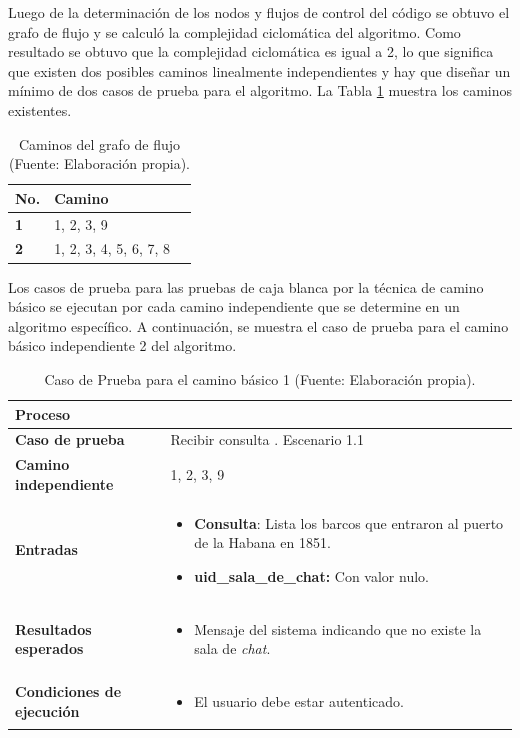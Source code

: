Luego de la determinación de los nodos y flujos de control del código se obtuvo el grafo de flujo y se calculó la complejidad ciclomática del algoritmo.
Como resultado se obtuvo que la complejidad ciclomática es igual a 2, lo que significa que existen dos posibles caminos
linealmente independientes y hay que diseñar un mínimo de dos casos de prueba para el algoritmo. La Tabla \ref{tab:caminos-grafos2} muestra los caminos existentes.

\begin{table}[h]
	\centering
	\caption{Caminos del grafo de flujo (Fuente: Elaboración propia).}
	\label{tab:caminos-grafos2}
	\begin{tabular}{|>{\bfseries}m{5cm}|m{4cm}|m{4cm}|}
		\hline
		\textbf{No.} & \textbf{Camino} \\ \hline
		1            & 1, 2, 3, 9      \\ \hline
		2            & 1, 2, 3, 4, 5, 6, 7, 8   \\ \hline
	\end{tabular}
\end{table}

Los casos de prueba para las pruebas de caja blanca por la técnica de camino básico se ejecutan por cada
camino independiente que se determine en un algoritmo específico. A continuación, se muestra el caso de
prueba para el camino básico independiente 2 del algoritmo.

\begin{longtable}{|p{4cm}|p{11cm}|}
	\caption{Caso de Prueba para el camino básico 1 (Fuente: Elaboración propia).}
	\label{tab:caminos-grafo}\\
	\hline
	\textbf{Proceso} &  \\ \hline
	\textbf{Caso de prueba} & Recibir consulta . Escenario 1.1 \\ \hline
	\textbf{Camino independiente} & 1, 2, 3, 9 \\ \hline
	\textbf{Entradas} &
	\begin{itemize}
		\item \textbf{Consulta}: Lista los barcos que entraron al puerto de la Habana en 1851.
		\item \textbf{uid\_sala\_de\_chat:} Con valor nulo.
	\end{itemize} \\ \hline
	\textbf{Resultados esperados} &
		\begin{itemize}
			\item Mensaje del sistema indicando que no existe la sala de \textit{chat}.
		\end{itemize} \\ \hline
		
	\textbf{Condiciones de ejecución} &
	\begin{itemize}
		\item El usuario debe estar autenticado.
	\end{itemize} \\ \hline
\end{longtable}

